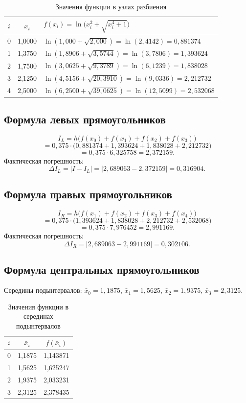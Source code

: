\documentclass[a4paper, final]{article}
\begin{document}
\begin{table}[h!]
\centering
\caption{Значения функции в узлах разбиения}
\label{tab:s1_nodes}
\begin{tabular}{|c|c|l|}
\hline
$i$ & $x_i$ & $f(x_i) = \ln\!\bigl(x_i^2+\sqrt{x_i^4+1}\bigr)$ \\
\hline
0 & 1,0000 & $\ln(1{,}000+\sqrt{2{,}000}) = \ln(2{,}4142) = 0{,}881374$ \\
1 & 1,3750 & $\ln(1{,}8906+\sqrt{3{,}5744}) = \ln(3{,}7806) = 1{,}393624$ \\
2 & 1,7500 & $\ln(3{,}0625+\sqrt{9{,}3789}) = \ln(6{,}1239) = 1{,}838028$ \\
3 & 2,1250 & $\ln(4{,}5156+\sqrt{20{,}3910}) = \ln(9{,}0336) = 2{,}212732$ \\
4 & 2,5000 & $\ln(6{,}2500+\sqrt{39{,}0625}) = \ln(12{,}5099) = 2{,}532068$ \\
\hline
\end{tabular}
\end{table}

\subsection{Формула левых прямоугольников}

\[
I_L = h\bigl(f(x_0)+f(x_1)+f(x_2)+f(x_3)\bigr) \]
    \[= 0{,}375\cdot\bigl(0{,}881374+1{,}393624+1{,}838028+2{,}212732\bigr)\]
    \[= 0{,}375\cdot 6{,}325758 = 2{,}372159.
\]
Фактическая погрешность:
\[
\Delta I_L = |I - I_L| = |2{,}689063 - 2{,}372159| = 0{,}316904.
\]

\subsection{Формула правых прямоугольников}

\[
I_R = h\bigl(f(x_1)+f(x_2)+f(x_3)+f(x_4)\bigr)\]
    \[= 0{,}375\cdot\bigl(1{,}393624+1{,}838028+2{,}212732+2{,}532068\bigr)\]
    \[= 0{,}375\cdot 7{,}976452 = 2{,}991169.
\]
Фактическая погрешность:
\[
\Delta I_R = |2{,}689063 - 2{,}991169| = 0{,}302106.
\]

\subsection{Формула центральных прямоугольников}

Середины подынтервалов: $\bar x_0 = 1{,}1875$, $\bar x_1 = 1{,}5625$,
$\bar x_2 = 1{,}9375$, $\bar x_3 = 2{,}3125$.

\begin{table}[h!]
\centering
\caption{Значения функции в серединах подынтервалов}
\label{tab:s1_mid}
\begin{tabular}{|c|c|c|}
\hline
$i$ & $\bar x_i$ & $f(\bar x_i)$ \\
\hline
0 & 1,1875 & 1,143871 \\
1 & 1,5625 & 1,625247 \\
2 & 1,9375 & 2,033231 \\
3 & 2,3125 & 2,378435 \\
\hline
\end{tabular}
\end{table}
\end{document}
